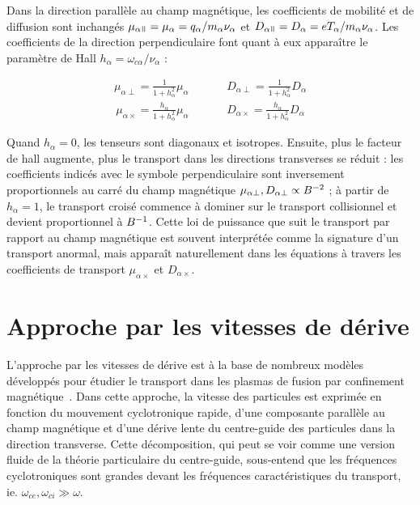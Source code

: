 \begin{refsection}
Dans la direction parallèle au champ magnétique, les coefficients de mobilité et
de diffusion sont inchangés
$\mu_{\alpha\para}=\mu_{\alpha}=q_\alpha/m_\alpha\nu_\alpha$ et
$D_{\alpha\para}=D_\alpha=eT_\alpha/m_\alpha\nu_\alpha$. Les coefficients de la
direction perpendiculaire font quant à eux apparaître le paramètre de Hall
$h_\alpha=\omega_{c\alpha}/\nu_\alpha$ :

\begin{align}
\mu_{\alpha\perp}=\frac{1}{1+h_\alpha^2}\mu_\alpha\;\;\;\;\;\;\;\;
\;\;\;\;D_{\alpha\perp}=\frac{1}{1+h_\alpha^2}D_\alpha
\end{align}
\begin{align}
\mu_{\alpha\times}=\frac{h_\alpha}{1+h_\alpha^2}\mu_\alpha\;\;\;\;
\;\;\;\;\;\;\;\;D_{\alpha\times}=\frac{h_\alpha}{1+h_\alpha^2}D_\alpha
\end{align}

Quand $h_\alpha=0$, les tenseurs sont diagonaux et isotropes. Ensuite, plus le
facteur de hall augmente, plus le transport dans les directions transverses se
réduit :
les coefficients indicés avec le symbole perpendiculaire sont inversement
proportionnels au carré du champ magnétique $\mu_{\alpha\perp},
D_{\alpha\perp}\propto B^{{-2}}$ ; à partir de $h_\alpha=1$, le
transport croisé commence à dominer sur le transport collisionnel et devient proportionnel à
$B^{{-1}}$. Cette loi de puissance que suit le transport par rapport au
champ magnétique est souvent interprétée comme la signature d'un transport
anormal, mais apparaît naturellement dans les équations à travers les
coefficients de transport $\mu_{\alpha\times}$ et $D_{\alpha\times}$.


\section{Approche par les vitesses de dérive}
\label{vitessesDerive}
L'approche par les vitesses de dérive est à la base de nombreux modèles
développés pour étudier le transport dans les plasmas de fusion par
confinement magnétique~\parencite{Garcia,Bisai,Tamain}. Dans cette approche, la
vitesse des particules est exprimée en fonction du mouvement cyclotronique rapide, d'une composante
parallèle au champ magnétique et d'une dérive lente du centre-guide des particules dans
la direction transverse. Cette décomposition, qui peut se voir comme une
version fluide de la théorie particulaire du centre-guide, sous-entend que les
fréquences cyclotroniques sont grandes devant les fréquences caractéristiques du
transport, ie. $\omega_{ce},\omega_{ci}\gg\omega$. 
 

\end{refsection}
